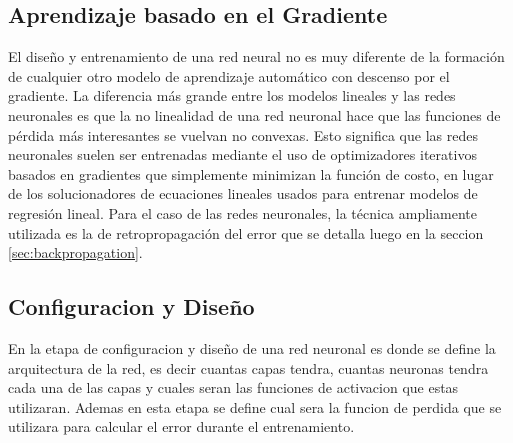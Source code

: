 \documentclass[a4paper,11pt,spanish]{book}
\begin{document}
      \subsection{Aprendizaje basado en el Gradiente}
	El diseño y entrenamiento de una red neural no es muy diferente de la formación de cualquier otro modelo de aprendizaje automático con descenso por el gradiente.
	La diferencia más grande entre los modelos lineales y las redes neuronales es que la no linealidad de una red neuronal hace que las funciones de pérdida
	más interesantes se vuelvan no convexas. Esto significa que las redes neuronales suelen ser entrenadas mediante el uso de optimizadores iterativos basados ​​en gradientes
	que simplemente minimizan la función de costo, en lugar de los solucionadores de ecuaciones lineales usados ​​para entrenar modelos de regresión lineal. Para el caso de las
	redes neuronales, la técnica ampliamente utilizada es la de retropropagación del error que se detalla luego en la seccion \ref{sec:backpropagation}.
      
      \subsection{Configuracion y Diseño}
	En la etapa de configuracion y diseño de una red neuronal es donde se define la arquitectura de la red, es decir cuantas capas tendra, cuantas neuronas tendra cada una de las capas
	y cuales seran las funciones de activacion que estas utilizaran.
	Ademas en esta etapa se define cual sera la funcion de perdida que se utilizara para calcular el error durante el entrenamiento.
	
\end{document}
